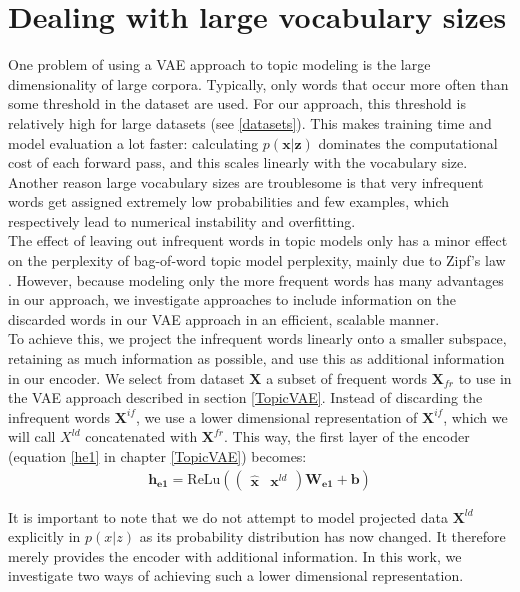 \documentclass{report}
\begin{document}
\section{Dealing with large vocabulary sizes}
One problem of using a VAE approach to topic modeling is the large dimensionality of large corpora. Typically, only words that occur more often than some threshold in the dataset are used. For our approach, this threshold is relatively high for large datasets (see \ref{datasets}). This makes training time and model evaluation a lot faster: calculating $p(\mathbf{x}|\mathbf{z})$ dominates the computational cost of each forward pass, and this scales linearly with the vocabulary size. Another reason large vocabulary sizes are troublesome is that very infrequent words get assigned extremely low probabilities and few examples, which respectively lead to numerical instability and overfitting. 
\\
The effect of leaving out infrequent words in topic models only has a minor effect on the perplexity of bag-of-word topic model perplexity, mainly due to Zipf's law \cite{kobayashi2014perplexity}. However, because modeling only the more frequent words has many advantages in our approach, we investigate approaches to include information on the discarded words in our VAE approach in an efficient, scalable manner.
\\
To achieve this, we project the infrequent words linearly onto a smaller subspace, retaining as much information as possible, and use this as additional information in our encoder. We select from dataset $\mathbf{X}$ a subset of frequent words $\mathbf{X}_{fr}$ to use in the VAE approach described in section \ref{TopicVAE}. Instead of discarding the infrequent words $\mathbf{X}^{if}$, we use a lower dimensional representation of $\mathbf{X}^{if}$, which we will call $X^{ld}$ concatenated with $\mathbf{X}^{fr}$. This way, the first layer of the encoder (equation \ref{he1} in chapter \ref{TopicVAE}) becomes:
\begin{align}
\mathbf{h_{e1}} = \text{ReLu}(\left(\begin{matrix}
\mathbf{\hat{x}} &
\mathbf{x}^{ld}
\end{matrix}\right)\mathbf{W_{e1}} + \mathbf{b}) \label{he1_RP}
\end{align}

It is important to note that we do not attempt to model projected data $\mathbf{X}^{ld}$ explicitly in $p(x|z)$  as its probability distribution has now changed.  It therefore merely provides the encoder with additional information. In this work, we investigate two ways of achieving such a lower dimensional representation. 
\end{document}
